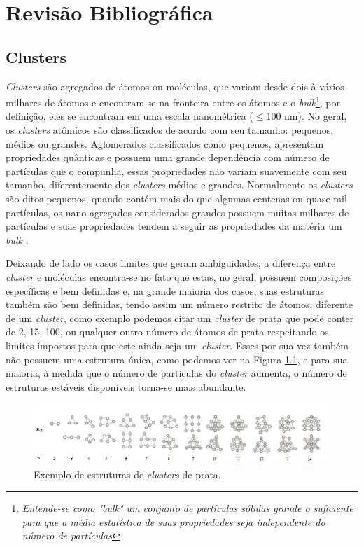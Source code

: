 \chapter{Revisão Bibliográfica}
\label{revisao_bibliografica}

\section{Clusters}
\label{c2-clusters}

\textit{Clusters} são agregados de átomos ou moléculas, que variam desde dois à vários milhares de átomos e encontram-se na fronteira entre os átomos e o \textit{bulk}\footnote{\textit{Entende-se como "bulk" um conjunto de partículas sólidas grande o suficiente para que a média estatística de suas propriedades seja independente do número de partículas\cite{bulk}}}\cite{Heer,Brack}, por definição, eles se encontram em uma escala nanométrica ($ \leqslant 100$ nm).
No geral, os \textit{clusters} atômicos são classificados de acordo com seu tamanho: pequenos, médios ou grandes. Aglomerados classificados como pequenos, apresentam propriedades quânticas e possuem uma grande dependência com número de partículas que o compunha, essas propriedades não variam suavemente com seu tamanho, diferentemente dos \textit{clusters} médios e grandes. Normalmente os \textit{clusters} são ditos pequenos, quando contém mais do que algumas centenas ou quase mil partículas, os nano-agregados considerados grandes possuem muitas milhares de partículas e suas propriedades tendem a seguir as propriedades da matéria um \textit{bulk} \cite{livro_cluster}.


Deixando de lado os casos limites que geram ambiguidades, a diferença entre \textit{cluster} e moléculas encontra-se no fato que estas, no geral, possuem composições específicas e bem definidas e, na grande maioria dos casos, suas estruturas também são bem definidas, tendo  assim um número restrito de átomos; diferente de um \textit{cluster}, como exemplo podemos citar um \textit{cluster} de prata que pode conter de 2, 15, 100, ou qualquer outro número de átomos de prata respeitando os limites impostos para que este ainda seja um \textit{cluster}. Esses por sua vez também não possuem uma estrutura única, como podemos ver na Figura \ref{fig:estrutura_cluster_ag}, e para sua maioria, à medida que o número de partículas do \textit{cluster} aumenta, o número de estruturas estáveis disponíveis torna-se mais abundante. 

\begin{figure}
  \centering
  \includegraphics[width=1\textwidth]{images/clusters/estrutura_cluster_ag}
  \caption{ Exemplo de estruturas de \textit{clusters} de prata.\cite{dissertacao_anderson}  }
  \label{fig:estrutura_cluster_ag}
\end{figure}


